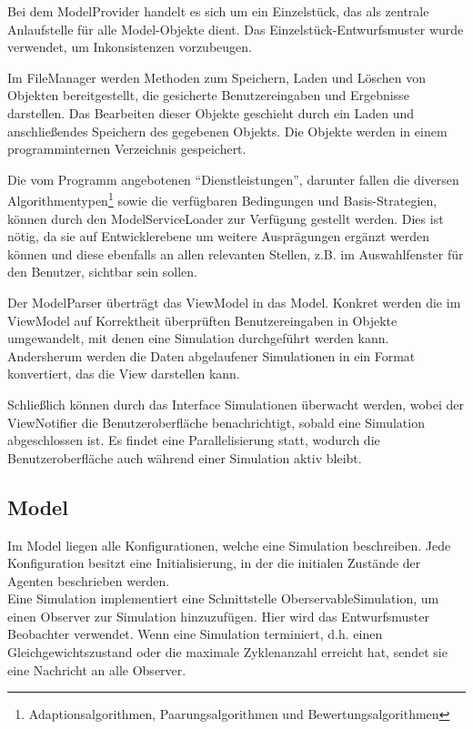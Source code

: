 Bei dem ModelProvider handelt es sich um ein Einzelstück, das als zentrale Anlaufstelle für alle Model-Objekte dient. Das Einzelstück-Entwurfsmuster wurde verwendet, um Inkonsistenzen vorzubeugen.

Im FileManager werden Methoden zum Speichern, Laden und Löschen von Objekten bereitgestellt, die gesicherte Benutzereingaben und Ergebnisse darstellen. Das Bearbeiten dieser Objekte geschieht durch ein Laden und anschließendes Speichern des gegebenen Objekts.
Die Objekte werden in einem programminternen Verzeichnis gespeichert.

Die vom Programm angebotenen "`Dienstleistungen"', darunter fallen die diversen Algorithmentypen\footnote{Adaptionsalgorithmen, Paarungsalgorithmen und Bewertungsalgorithmen} sowie die verfügbaren Bedingungen und Basis-Strategien, können durch den ModelServiceLoader zur Verfügung gestellt werden.
Dies ist nötig, da sie auf Entwicklerebene um weitere Ausprägungen ergänzt werden können und diese ebenfalls an allen relevanten Stellen, z.B. im Auswahlfenster für den Benutzer, sichtbar sein sollen.

Der ModelParser überträgt das ViewModel in das Model. Konkret werden die im ViewModel auf Korrektheit überprüften Benutzereingaben in Objekte umgewandelt, mit denen eine Simulation durchgeführt werden kann. Andersherum werden die Daten abgelaufener Simulationen in ein Format konvertiert, das die View darstellen kann.

Schließlich können durch das Interface Simulationen überwacht werden, wobei der ViewNotifier die Benutzeroberfläche benachrichtigt, sobald eine Simulation abgeschlossen ist. Es findet eine Parallelisierung statt, wodurch die Benutzeroberfläche auch während einer Simulation aktiv bleibt.

\subsection{Model}

\noindent
{}


Im Model liegen alle Konfigurationen, welche eine Simulation beschreiben. Jede Konfiguration besitzt eine Initialisierung, in der die initialen Zustände der Agenten beschrieben werden. \\

Eine Simulation implementiert eine Schnittstelle OberservableSimulation, um einen Observer zur Simulation hinzuzufügen. Hier wird das Entwurfsmuster Beobachter verwendet. Wenn eine Simulation terminiert, d.h. einen Gleichgewichtszustand oder die maximale Zyklenanzahl erreicht hat, sendet sie eine Nachricht an alle Observer.

